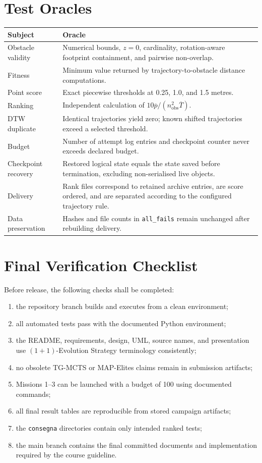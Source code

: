 \documentclass[11pt,a4paper]{report}
\newcommand{\code}[1]{\texttt{#1}}
\begin{document}
\section{Test Oracles}
\begin{table}[H]
\centering
\begin{tabularx}{\textwidth}{L{4.2cm} Y}
\toprule
\textbf{Subject} & \textbf{Oracle}\\
\midrule
Obstacle validity & Numerical bounds, $z=0$, cardinality, rotation-aware footprint containment, and pairwise non-overlap.\\
Fitness & Minimum value returned by trajectory-to-obstacle distance computations.\\
Point score & Exact piecewise thresholds at 0.25, 1.0, and 1.5 metres.\\
Ranking & Independent calculation of $10\overline{p}/(n_{\mathrm{obs}}^2\overline{T})$.\\
DTW duplicate & Identical trajectories yield zero; known shifted trajectories exceed a selected threshold.\\
Budget & Number of attempt log entries and checkpoint counter never exceeds declared budget.\\
Checkpoint recovery & Restored logical state equals the state saved before termination, excluding non-serialised live objects.\\
Delivery & Rank files correspond to retained archive entries, are score ordered, and are separated according to the configured trajectory rule.\\
Data preservation & Hashes and file counts in \code{all\_fails} remain unchanged after rebuilding delivery.\\
\bottomrule
\end{tabularx}
\end{table}

\section{Final Verification Checklist}
Before release, the following checks shall be completed:
\begin{enumerate}
  \item the repository branch builds and executes from a clean environment;
  \item all automated tests pass with the documented Python environment;
  \item the README, requirements, design, UML, source names, and presentation use $(1+1)$-Evolution Strategy terminology consistently;
  \item no obsolete TG-MCTS or MAP-Elites claims remain in submission artifacts;
  \item Missions 1--3 can be launched with a budget of 100 using documented commands;
  \item all final result tables are reproducible from stored campaign artifacts;
  \item the \code{consegna} directories contain only intended ranked tests;
  \item the main branch contains the final committed documents and implementation required by the course guideline.
\end{enumerate}
\end{document}
